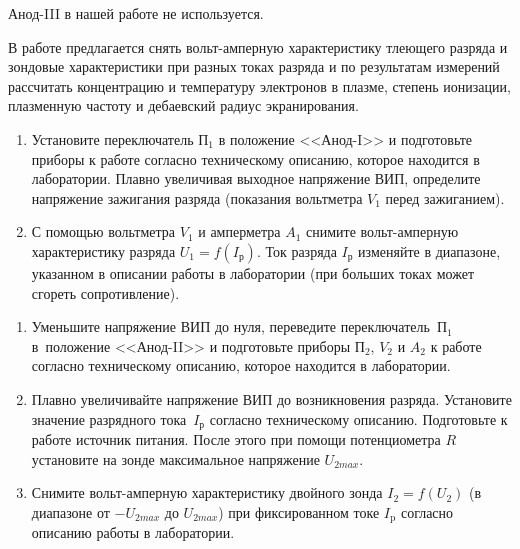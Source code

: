 Анод-III в нашей работе не используется.


\begin{lab:task}

В работе предлагается снять вольт-амперную характеристику тлеющего разряда и зондовые характеристики при разных токах
разряда и по результатам измерений рассчитать концентрацию и температуру электронов в плазме, степень ионизации,
плазменную частоту и дебаевский радиус экранирования.

 


\begin{enumerate}
\item Установите переключатель $\text{П}_1$ в положение <<Анод-I>> и подготовьте приборы к работе согласно техническому описанию, которое находится в лаборатории. Плавно увеличивая выходное напряжение ВИП, определите напряжение зажигания разряда (показания вольтметра $V_{1}$ перед зажиганием). 

\item С помощью вольтметра $V_{1}$ и амперметра $A_{1}$ снимите вольт-амперную характеристику разряда $U_{1}=f(I_\text{р})$. Ток разряда $I_\text{р}$ изменяйте в диапазоне, указанном в описании работы в лаборатории (при больших токах может сгореть сопротивление).

\end{enumerate}


\begin{enumerate}
\item Уменьшите напряжение ВИП до нуля, переведите переключатель~$\text{П}_1$
в~положение <<Анод-II>> и подготовьте приборы $\text{П}_{2}$, $V_{2}$ и $A_{2}$ к работе согласно техническому описанию, которое находится в лаборатории. 

\item Плавно увеличивайте напряжение ВИП до возникновения разряда. Установите значение разрядного
тока~$I_\text{р}$ согласно техническому описанию. Подготовьте к работе источник питания. После этого при помощи потенциометра $R$ установите на зонде максимальное напряжение $U_{2 max}$. 

\item Снимите вольт-амперную характеристику двойного зонда $I_{2}=f(U_{2})$ (в диапазоне от $-U_{2 max}$ до $U_{2 max}$) при фиксированном токе $I_\text{p}$ согласно описанию работы в лаборатории.


\end{enumerate}
\end{lab:task}
